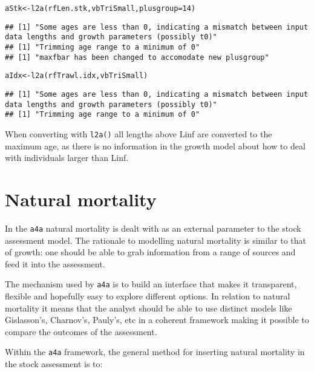 \documentclass[a4paper,english,10pt]{article}\usepackage[]{graphicx}\usepackage[]{color}
\makeatletter
\newcommand{\hlnum}[1]{\textcolor[rgb]{0.2,0.2,0.2}{#1}}%
\newcommand{\hlstd}[1]{\textcolor[rgb]{0,0,0}{#1}}%
\newcommand{\hlkwb}[1]{\textcolor[rgb]{0.361,0.506,0.596}{#1}}%
\newcommand{\hlkwc}[1]{\textcolor[rgb]{0.361,0.506,0.596}{#1}}%
\newcommand{\hlkwd}[1]{\textcolor[rgb]{0.361,0.506,0.596}{#1}}%
\newenvironment{kframe}{%
 \def\at@end@of@kframe{}%
 \ifinner\ifhmode%
  \def\at@end@of@kframe{\end{minipage}}%
  \begin{minipage}{\columnwidth}%
 \fi\fi%
 \def\FrameCommand##1{\hskip\@totalleftmargin \hskip-\fboxsep
 \colorbox{shadecolor}{##1}\hskip-\fboxsep
     \hskip-\linewidth \hskip-\@totalleftmargin \hskip\columnwidth}%
 \MakeFramed {\advance\hsize-\width
   \@totalleftmargin\z@ \linewidth\hsize
   \@setminipage}}%
 {\par\unskip\endMakeFramed%
 \at@end@of@kframe}
\newenvironment{knitrout}{}{} %
\newcommand{\initiative}[1]{{\texttt{#1}}}
\newcommand{\code}[1]{{\texttt{#1}}}
\makeatother
\begin{document}
\begin{knitrout}
\color{fgcolor}\begin{kframe}
\begin{alltt}
\hlstd{aStk} \hlkwb{<-} \hlkwd{l2a}\hlstd{(rfLen.stk, vbTriSmall,} \hlkwc{plusgroup}\hlstd{=}\hlnum{14}\hlstd{)}
\end{alltt}
\begin{verbatim}
## [1] "Some ages are less than 0, indicating a mismatch between input data lengths and growth parameters (possibly t0)"
## [1] "Trimming age range to a minimum of 0"
## [1] "maxfbar has been changed to accomodate new plusgroup"
\end{verbatim}
\begin{alltt}
\hlstd{aIdx} \hlkwb{<-} \hlkwd{l2a}\hlstd{(rfTrawl.idx, vbTriSmall)}
\end{alltt}
\begin{verbatim}
## [1] "Some ages are less than 0, indicating a mismatch between input data lengths and growth parameters (possibly t0)"
## [1] "Trimming age range to a minimum of 0"
\end{verbatim}
\end{kframe}
\end{knitrout}

When converting with \code{l2a()} all lengths above Linf are converted to the 
maximum age, as there is no information in the growth model about how to deal with individuals larger than Linf. 

\pagebreak
\section{Natural mortality}\label{sec:M}

In the \initiative{a4a} natural mortality is dealt with as an external parameter to the stock assessment model. The rationale to modelling natural mortality is similar to that of growth: one should be able to grab information from a range of sources and feed it into the assessment.

The mechanism used by \initiative{a4a} is to build an interface that makes it transparent, flexible and hopefully easy to explore different options. In relation to natural mortality it means that the analyst should be able to use distinct models like Gislasson's, Charnov's, Pauly's, etc in a coherent framework making it possible to compare the outcomes of the assessment. 

Within the \initiative{a4a} framework, the general method for inserting natural mortality in the stock assessment is to:
\end{document}
